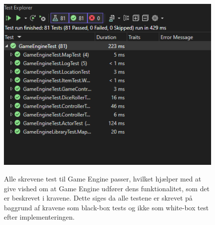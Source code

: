 \begin{figure}[h]
  \centering
  \caption{Alle skrevene test til Game Engine passer, hvilket hjælper med at give vished
          om at Game Engine udfører dens funktionalitet, som det er beskrevet i kravene.
          Dette siges da alle testene er skrevet på baggrund af kravene som black-box tests
          og ikke som white-box test efter implementeringen.}
  \includegraphics[scale=0.4]{02-body/Images/Test Results.png}
  \label{fig:TestResultsGameEngine}
\end{figure}



